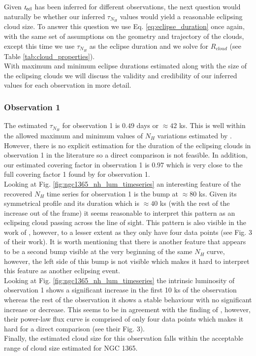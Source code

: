 \documentclass{aa}
\begin{document}
Given $t_{\rm ecl}$ has been inferred for different observations, the next question would naturally be whether our inferred $\tau_{N_H}$ values would yield a reasonable eclipsing cloud size. To answer this question we use Eq. \ref{eq:eclipse_duration} once again, with the same set of assumptions on the geometry and trajectory of the clouds, except this time we use $\tau_{N_H}$ as the eclipse duration and we solve for $R_{cloud}$ (see Table \ref{tab:cloud_properties}). \\
With maximum and minimum eclipse durations estimated along with the size of the eclipsing clouds we will discuss the validity and credibility of our inferred values for each observation in more detail. \\ 

\subsubsection*{Observation 1}
The estimated $\tau_{N_H}$ for observation 1 is $0.49$ days or $\approx 42$ ks. This is well within the allowed maximum and minimum values of $N_H$ variations estimated by \citet{Pietrini2024}. However, there is no explicit estimation for the duration of the eclipsing clouds in observation 1 in the literature so a direct comparison is not feasible. In addition, our estimated covering factor in observation 1 is $0.97$ which is very close to the full covering factor 1 found by \citet{Rivers2015} for observation 1. \\
Looking at Fig. \ref{fig:ngc1365_nh_lum_timeseries} an interesting feature of the recovered $N_H$ time series for observation 1 is the bump at $\approx 80$ ks. Given its symmetrical profile and its duration which is $\approx 40$ ks (with the rest of the increase out of the frame) it seems reasonable to interpret this pattern as an eclipsing cloud passing across the line of sight. This pattern is also visible in the work of \citet{Rivers2015}, however, to a lesser extent as they only have four data points (see Fig. 3 of their work). It is worth mentioning that there is another feature that appears to be a second bump visible at the very beginning of the same $N_H$ curve, however, the left side of this bump is not visible which makes it hard to interpret this feature as another eclipsing event. \\
Looking at Fig. \ref{fig:ngc1365_nh_lum_timeseries} the intrinsic luminosity of observation 1 shows a significant increase in the first 10 ks of the observation whereas the rest of the observation it shows a stable behaviour with no significant increase or decrease. This seems to be in agreement with the finding of \citet{Rivers2015}, however, their power-law flux curve is comprised of only four data points which makes it hard for a direct comparison (see their Fig. 3). \\
Finally, the estimated cloud size for this observation falls within the acceptable range of cloud size estimated for NGC 1365. \\
\end{document}

